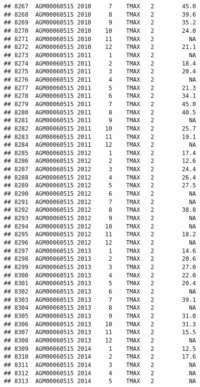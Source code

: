 \documentclass{article}\usepackage[]{graphicx}\usepackage[]{color}
\makeatletter
\newenvironment{kframe}{%
 \def\at@end@of@kframe{}%
 \ifinner\ifhmode%
  \def\at@end@of@kframe{\end{minipage}}%
  \begin{minipage}{\columnwidth}%
 \fi\fi%
 \def\FrameCommand##1{\hskip\@totalleftmargin \hskip-\fboxsep
 \colorbox{shadecolor}{##1}\hskip-\fboxsep
     \hskip-\linewidth \hskip-\@totalleftmargin \hskip\columnwidth}%
 \MakeFramed {\advance\hsize-\width
   \@totalleftmargin\z@ \linewidth\hsize
   \@setminipage}}%
 {\par\unskip\endMakeFramed%
 \at@end@of@kframe}
\newenvironment{knitrout}{}{} %
\makeatother
\begin{document}
\begin{knitrout}
\begin{kframe}
\begin{verbatim}
## 8267  AGM00060515 2010     7    TMAX   2        45.0
## 8268  AGM00060515 2010     8    TMAX   2        39.6
## 8269  AGM00060515 2010     9    TMAX   2        35.2
## 8270  AGM00060515 2010    10    TMAX   2        24.0
## 8271  AGM00060515 2010    11    TMAX   2          NA
## 8272  AGM00060515 2010    12    TMAX   2        21.1
## 8273  AGM00060515 2011     1    TMAX   2          NA
## 8274  AGM00060515 2011     2    TMAX   2        18.4
## 8275  AGM00060515 2011     3    TMAX   2        20.4
## 8276  AGM00060515 2011     4    TMAX   2          NA
## 8277  AGM00060515 2011     5    TMAX   2        21.3
## 8278  AGM00060515 2011     6    TMAX   2        34.1
## 8279  AGM00060515 2011     7    TMAX   2        45.0
## 8280  AGM00060515 2011     8    TMAX   2        40.5
## 8281  AGM00060515 2011     9    TMAX   2          NA
## 8282  AGM00060515 2011    10    TMAX   2        25.7
## 8283  AGM00060515 2011    11    TMAX   2        19.1
## 8284  AGM00060515 2011    12    TMAX   2          NA
## 8285  AGM00060515 2012     1    TMAX   2        17.4
## 8286  AGM00060515 2012     2    TMAX   2        12.6
## 8287  AGM00060515 2012     3    TMAX   2        24.4
## 8288  AGM00060515 2012     4    TMAX   2        26.4
## 8289  AGM00060515 2012     5    TMAX   2        27.5
## 8290  AGM00060515 2012     6    TMAX   2          NA
## 8291  AGM00060515 2012     7    TMAX   2          NA
## 8292  AGM00060515 2012     8    TMAX   2        38.8
## 8293  AGM00060515 2012     9    TMAX   2          NA
## 8294  AGM00060515 2012    10    TMAX   2          NA
## 8295  AGM00060515 2012    11    TMAX   2        18.2
## 8296  AGM00060515 2012    12    TMAX   2          NA
## 8297  AGM00060515 2013     1    TMAX   2        14.6
## 8298  AGM00060515 2013     2    TMAX   2        20.6
## 8299  AGM00060515 2013     3    TMAX   2        27.0
## 8300  AGM00060515 2013     4    TMAX   2        22.0
## 8301  AGM00060515 2013     5    TMAX   2        20.4
## 8302  AGM00060515 2013     6    TMAX   2          NA
## 8303  AGM00060515 2013     7    TMAX   2        39.1
## 8304  AGM00060515 2013     8    TMAX   2          NA
## 8305  AGM00060515 2013     9    TMAX   2        31.0
## 8306  AGM00060515 2013    10    TMAX   2        31.3
## 8307  AGM00060515 2013    11    TMAX   2        15.5
## 8308  AGM00060515 2013    12    TMAX   2          NA
## 8309  AGM00060515 2014     1    TMAX   2        12.5
## 8310  AGM00060515 2014     2    TMAX   2        17.6
## 8311  AGM00060515 2014     3    TMAX   2          NA
## 8312  AGM00060515 2014     4    TMAX   2          NA
## 8313  AGM00060515 2014     5    TMAX   2          NA

\end{verbatim}
\end{kframe}
\end{knitrout}
\end{document}
